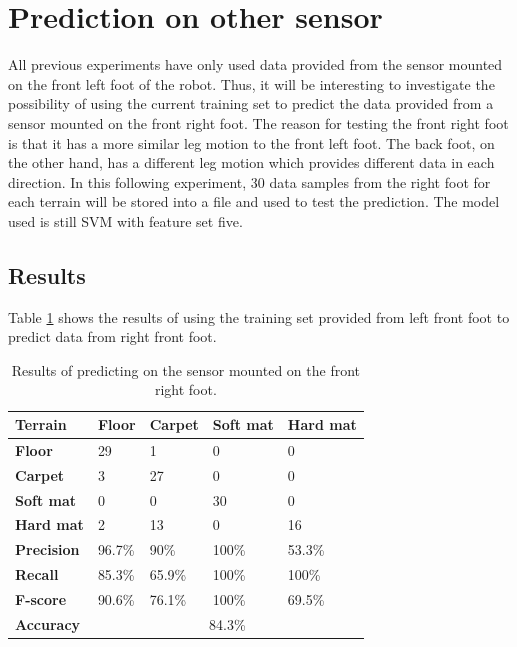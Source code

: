 \documentclass[USenglish]{ifimaster}  %
\begin{document}
\newpage
\section{Prediction on other sensor}
All previous experiments have only used data provided from the sensor mounted on the front left foot of the robot. Thus, it will be interesting to investigate the possibility of using the current training set to predict the data provided from a sensor mounted on the front right foot. The reason for testing the front right foot is that it has a more similar leg motion to the front left foot. The back foot, on the other hand, has a different leg motion which provides different data in each direction. In this following experiment, 30 data samples from the right foot for each terrain will be stored into a file and used to test the prediction. The model used is still SVM with feature set five.

	
\subsection{Results} 
Table \ref{tab:pred} shows the results of using the training set provided from left front foot to predict data from right front foot.
\begin{table}[h]
	\centering
	\begin{tabular}{lllll}
		\hline
		\textbf{Terrain} & \textbf{Floor} & \textbf{Carpet} & \textbf{Soft mat} & \textbf{Hard mat} \\ \hline
		\textbf{Floor} & \cellcolor[HTML]{FFFFC7}29 & 1 & 0 & 0 \\
		\textbf{Carpet} & 3 & \cellcolor[HTML]{FFFFC7}27 & 0 & 0 \\
		\textbf{Soft mat} & 0 & 0 & \cellcolor[HTML]{FFFFC7}30 & 0 \\
		\textbf{Hard mat} & 2 & 13 & 0 & \cellcolor[HTML]{FFFFC7}16 \\ \hline
		\textbf{Precision} & 96.7\% & 90\% & 100\% & 53.3\% \\
		\textbf{Recall} & 85.3\% & 65.9\% & 100\% & 100\% \\
		\textbf{F-score} & 90.6\% & 76.1\% & 100\% & 69.5\% \\ \hline
		\textbf{Accuracy} & \multicolumn{4}{c}{84.3\%} \\ \hline
	\end{tabular}
	\caption[Results of predicting sensor mounted on the front right foot]{Results of predicting on the sensor mounted on the front right foot.}
	\label{tab:pred}
\end{table}
	\FloatBarrier
	
\end{document}
